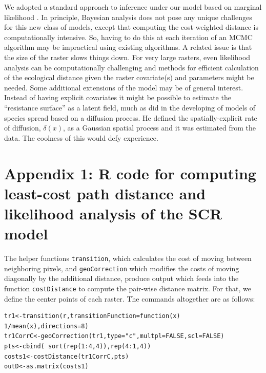 \documentclass[12pt]{article}
\begin{document}
We adopted a standard approach to inference under our model based on
marginal likelihood \citep{borchers_efford:2008}. In principle,
Bayesian analysis does not pose any unique challenges for this new
class of models, except that computing the cost-weighted distance is
computationally intensive.
 So, having to do this at each iteration of an
MCMC algorithm may be impractical using existing algorithms.
A related issue is that the size of the raster slows things down. For
very large rasters, even likelihood analysis can be computationally
challenging and methods for efficient calculation of the ecological distance
given the raster covariate(s) and parameters might be needed.
Some additional extensions of the model may be of general
interest. Instead of
having explicit covariates it might be possible to estimate the
``resistance surface'' as a latent field, much as \citep{wikle:2003}
 did in the developing of models of species spread based on a
 diffusion process. He defined the spatially-explicit rate of
diffusion, $\delta(x)$, as a Gaussian spatial process and it was
estimated from the data.  The coolness of this would defy experience.














\newpage



\newpage






\section*{Appendix 1: {\bf R} code for computing least-cost path
  distance and likelihood analysis of the SCR model}

The helper functions \mbox{\tt transition}, which
calculates the cost of moving between neighboring pixels, and
\mbox{\tt geoCorrection} which modifies the costs of moving diagonally
by the additional distance, produce output which feeds into the
function \mbox{\tt costDistance} to compute the pair-wise distance
matrix. For that, we define the center points of each raster.  The
commands altogether are as follows:

\begin{verbatim}
tr1<-transition(r,transitionFunction=function(x) 1/mean(x),directions=8)
tr1CorrC<-geoCorrection(tr1,type="c",multpl=FALSE,scl=FALSE)
pts<-cbind( sort(rep(1:4,4)),rep(4:1,4))
costs1<-costDistance(tr1CorrC,pts)
outD<-as.matrix(costs1)
\end{verbatim}
\end{document}
